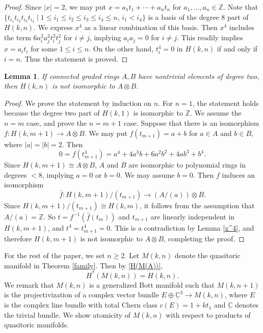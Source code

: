 \documentclass[a4paper]{amsart}
\numberwithin{equation}{section}
\newtheorem{lemma}[theorem]{Lemma}
\theoremstyle{definition}
\theoremstyle{remark}
\numberwithin{equation}{section}
\newcommand{\Z}{\mathbb{Z}}
\newcommand{\C}{\mathbb{C}}
\begin{document}
\begin{proof}
  Since $|x|=2$, we may put $x=a_1t_1+\cdots+a_nt_n$ for $a_1,\ldots,a_n\in\Z$. Note that $\{t_{i_1}t_{i_2}t_{i_3}t_{i_4}\mid 1\le i_1\le i_2\le i_3\le i_4\le n,\,i_1<i_4\}$ is a basis of the degree $8$ part of $H(k,n)$. We express $x^4$ as a linear combination of this basis. Then $x^4$ includes the term $6a_i^2a_j^2t_i^2t_j^2$ for $i\ne j$, implying $a_ia_j=0$ for $i\ne j$. This readily implies $x=a_it_i$ for some $1\le i\le n$. On the other hand, $t_i^4=0$ in $H(k,n)$ if and only if $i=n$. Thus the statement is proved.
\end{proof}



\begin{lemma}
  \label{atomic H(k,n)}
  If connected graded rings $A,B$ have nontrivial elements of degree two, then $H(k,n)$ is not isomorphic to $A\otimes B$.
\end{lemma}

\begin{proof}
  We prove the statement by induction on $n$. For $n=1$, the statement holds because the degree two part of $H(k,1)$ is isomorphic to $\Z$. We assume the $n=m$ case, and prove the $n=m+1$ case. Suppose that there is an isomorphism $f\colon H(k,m+1)\to A\otimes B$. We may put $f(t_{m+1})=a+b$ for $a\in A$ and $b\in B$, where $|a|=|b|=2$. Then
  \[
    0=f(t_{m+1}^4)=a^4+4a^3b+6a^2b^2+4ab^3+b^4.
  \]
  Since $H(k,m+1)\cong A\otimes B$, $A$ and $B$ are isomorphic to polynomial rings in degrees $<8$, implying $a=0$ or $b=0$. We may assume $b=0$. Then $f$ induces an isomorphism
  \[
    \bar{f}\colon H(k,m+1)/(t_{m+1})\to(A/(a))\otimes B.
  \]
  Since $H(k,m+1)/(t_{m+1})\cong H(k,m)$, it follows from the assumption that $A/(a)=\Z$. So $t=f^{-1}(\bar{f}(t_m))$ and $t_{m+1}$ are linearly independent in $H(k,m+1)$, and $t^4=t_{m+1}^4=0$. This is a contradiction by Lemma \ref{x^4}, and therefore $H(k,m+1)$ is not isomorphic to $A\otimes B$, completing the proof.
\end{proof}



For the rest of the paper, we set $n\ge 2$. Let $M(k,n)$ denote the quasitoric manifold in Theorem \ref{family}. Then by \eqref{H(M(A))},
\begin{equation}
  \label{M(A) H(k,n)}
  H^*(M(k,n))=H(k,n).
\end{equation}
We remark that $M(k,n)$ is a generalized Bott manifold such that $M(k,n+1)$ is the projectivization of a complex vector bundle $E\oplus\underline{\C}^3\to M(k,n)$, where $E$ is the complex line bundle with total Chern class $c(E)=1+kt_1$ and $\underline{\C}$ denotes the trivial bundle. We show atomicity of $M(k,n)$ with respect to products of quasitoric manifolds.
\end{document}
